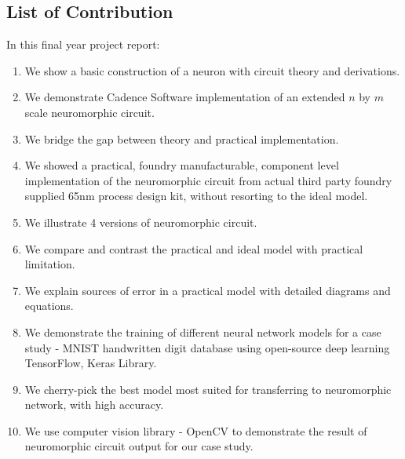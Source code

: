 \subsection{List of Contribution}
In this final year project report:
\begin{enumerate}
	\item We show a basic construction of a neuron with circuit theory and derivations.
	\item We demonstrate Cadence Software implementation of an extended $n$ by $m$ scale neuromorphic circuit.
	\item We bridge the gap between theory and practical implementation.
	\item We showed a practical, foundry manufacturable, component level implementation of the neuromorphic circuit from actual third party foundry supplied 65nm process design kit, without resorting to the ideal model.
	\item We illustrate 4 versions of neuromorphic circuit.
	\item We compare and contrast the practical and ideal model with practical limitation.
	\item We explain sources of error in a practical model with detailed diagrams and equations.
	\item We demonstrate the training of different neural network models for a case study - MNIST handwritten digit database using open-source deep learning TensorFlow, Keras Library.
	\item We cherry-pick the best model most suited for transferring to neuromorphic network, with high accuracy.
	\item We use computer vision library - OpenCV to demonstrate the result of neuromorphic circuit output for our case study.
	
\end{enumerate}
